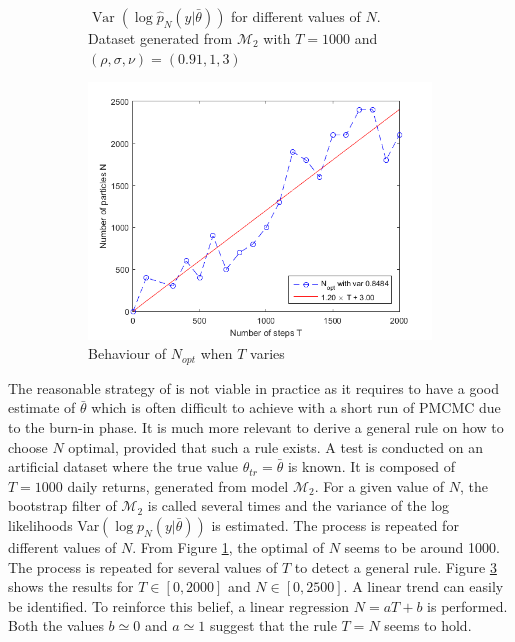 \documentclass[11pt,a4,twosided,singlespacing,titlepagenumber=on]{scrreprt}
\numberwithin{equation}{chapter} %
\theoremstyle{remark}
\DeclareMathOperator{\var}{Var}
\begin{document}
\begin{figure}[H]
\begin{subfigure}[1b]{0.49\textwidth}
        \caption{$\var(\log \hat{p}_N(y|\bar{\theta}))$ for different values of $N$. Dataset generated from $\mathcal{M}_2$ with $T=1000$ and $(\rho,\sigma,\nu) = (0.91,1,3)$}
        \label{est_var_pn_theta_n}
    \end{subfigure}
    \begin{subfigure}[1b]{0.49\textwidth}
        \centering
        \includegraphics[width=1\textwidth]{n_opt_function_t}
        \caption{Behaviour of $N_{opt}$ when $T$ varies}
        \label{n_opt_function_t}
    \end{subfigure}
    \caption{}
\end{figure}




The reasonable strategy of \cite{pitt2012} is not viable in practice as it requires to have a good estimate of $\bar{\theta}$ which is often difficult to achieve with a short run of PMCMC due to the burn-in phase. It is much more relevant to derive a general rule on how to choose $N$ optimal, provided that such a rule exists. A test is conducted on an artificial dataset where the true value $\theta_{tr} = \bar{\theta}$ is known. It is composed of $T=1000$ daily returns, generated from model $\mathcal{M}_2$. For a given value of $N$, the bootstrap filter of $\mathcal{M}_2$ is called several times and the variance of the log likelihoods Var$(\log p_N(y|\bar{\theta}))$ is estimated. The process is repeated for different values of $N$. From Figure \ref{est_var_pn_theta_n}, the optimal of $N$ seems to be around 1000. The process is repeated for several values of $T$ to detect a general rule. Figure \ref{n_opt_function_t} shows the results for $T \in [0, 2000]$ and $N \in [0, 2500]$. A linear trend can easily be identified. To reinforce this belief, a linear regression $N = a T + b$ is performed. Both the values $b \simeq 0$ and $a \simeq 1$ suggest that the rule $T = N$ seems to hold.
\end{document}
